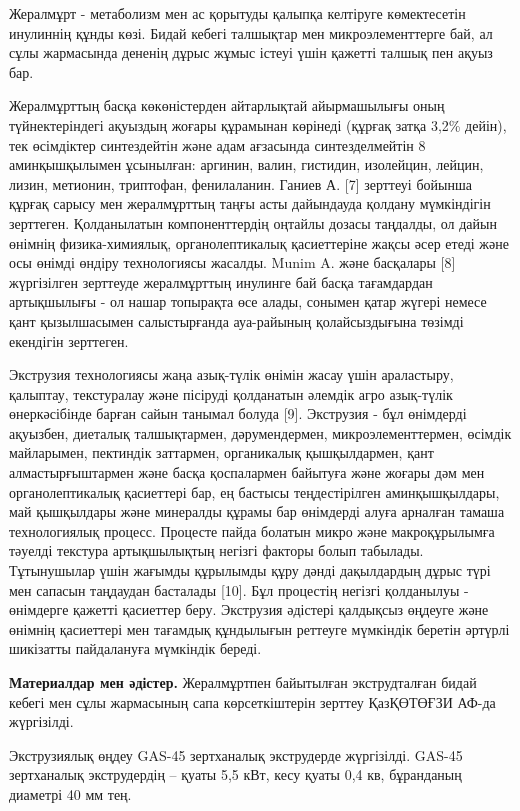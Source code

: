 Жералмұрт - метаболизм мен ас қорытуды қалыпқа келтіруге көмектесетін
инулиннің құнды көзі. Бидай кебегі талшықтар мен микроэлементтерге бай,
ал сұлы жармасында дененің дұрыс жұмыс істеуі үшін қажетті талшық пен
ақуыз бар.

Жералмұрттың басқа көкөністерден айтарлықтай айырмашылығы оның
түйнектеріндегі ақуыздың жоғары құрамынан көрінеді (құрғақ затқа 3,2\%
дейін), тек өсімдіктер синтездейтін және адам ағзасында синтезделмейтін
8 аминқышқылымен ұсынылған: аргинин, валин, гистидин, изолейцин, лейцин,
лизин, метионин, триптофан, фенилаланин. Ганиев А. {[}7{]} зерттеуі
бойынша құрғақ сарысу мен жералмұрттың таңғы асты дайындауда қолдану
мүмкіндігін зерттеген. Қолданылатын компоненттердің оңтайлы дозасы
таңдалды, ол дайын өнімнің физика-химиялық, органолептикалық
қасиеттеріне жақсы әсер етеді және осы өнімді өндіру технологиясы
жасалды. Munim A. және басқалары {[}8{]} жүргізілген зерттеуде
жералмұрттың инулинге бай басқа тағамдардан артықшылығы - ол нашар
топырақта өсе алады, сонымен қатар жүгері немесе қант қызылшасымен
салыстырғанда ауа-райының қолайсыздығына төзімді екендігін зерттеген.

Экструзия технологиясы жаңа азық-түлік өнімін жасау үшін араластыру,
қалыптау, текстуралау және пісіруді қолданатын әлемдік агро азық-түлік
өнеркәсібінде барған сайын танымал болуда {[}9{]}. Экструзия - бұл
өнімдерді ақуызбен, диеталық талшықтармен, дәрумендермен,
микроэлементтермен, өсімдік майларымен, пектиндік заттармен, органикалық
қышқылдармен, қант алмастырғыштармен және басқа қоспалармен байытуға
және жоғары дәм мен органолептикалық қасиеттері бар, ең бастысы
теңдестірілген аминқышқылдары, май қышқылдары және минералды құрамы бар
өнімдерді алуға арналған тамаша технологиялық процесс. Процесте пайда
болатын микро және макроқұрылымға тәуелді текстура артықшылықтың негізгі
факторы болып табылады. Тұтынушылар үшін жағымды құрылымды құру дәнді
дақылдардың дұрыс түрі мен сапасын таңдаудан басталады {[}10{]}. Бұл
процестің негізгі қолданылуы - өнімдерге қажетті қасиеттер беру.
Экструзия әдістері қалдықсыз өңдеуге және өнімнің қасиеттері мен
тағамдық құндылығын реттеуге мүмкіндік беретін әртүрлі шикізатты
пайдалануға мүмкіндік береді.

{\bfseries Материалдар мен әдістер.} Жералмұртпен байытылған экструдталған
бидай кебегі мен сұлы жармасының сапа көрсеткіштерін зерттеу ҚазҚӨТӨҒЗИ
АФ-да жүргізілді.

Экструзиялық өңдеу GAS-45 зертханалық экструдерде жүргізілді. GAS-45
зертханалық экструдердің -- қуаты 5,5 кВт, кесу қуаты 0,4 кв, бұранданың
диаметрі 40 мм тең.

